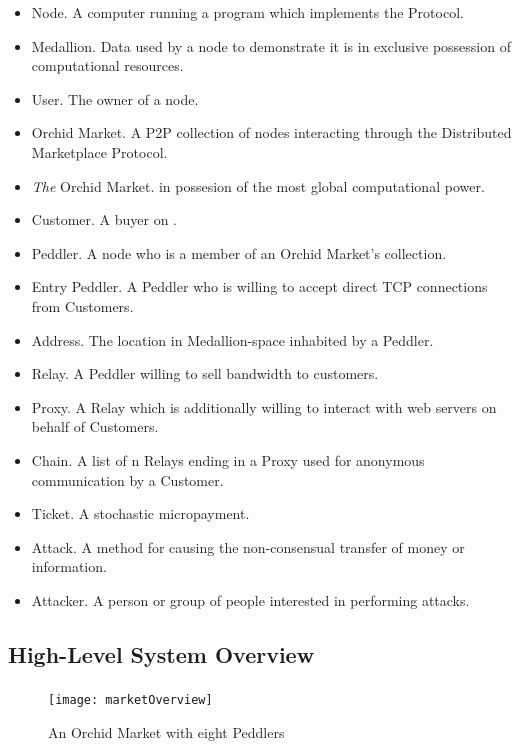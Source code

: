 \begin{itemize}
\item Node. A computer running a program which implements the \Orchid{} Protocol.
\item Medallion. Data used by a node to demonstrate it is in exclusive possession of computational resources.
\item User. The owner of a node.
\item Orchid Market. A P2P collection of nodes interacting through the \Orchid{} Distributed Marketplace Protocol.
\item \emph{The} Orchid Market. \TOM{} in possesion of the most global computational power.
\item Customer. A buyer on \tOM{}.
\item Peddler. A node who is a member of an Orchid Market's collection.
\item Entry Peddler. A Peddler who is willing to accept direct TCP connections from Customers.
\item Address. The location in Medallion-space inhabited by a Peddler.
\item Relay. A Peddler willing to sell bandwidth to customers.
\item Proxy. A Relay which is additionally willing to interact with web servers on behalf of Customers.
\item Chain. A list of n Relays ending in a Proxy used for anonymous communication by a Customer.
\item Ticket. A stochastic micropayment.
\item Attack. A method for causing the non-consensual transfer of money or information.
\item Attacker. A person or group of people interested in performing attacks.
\end{itemize}

\subsection{High-Level System Overview}

\subsubsection{\TOM{}}

\begin{figure}[htbp]
  \centering
  \texttt{[image: marketOverview]}
  \caption{An Orchid Market with eight Peddlers}
\end{figure}

